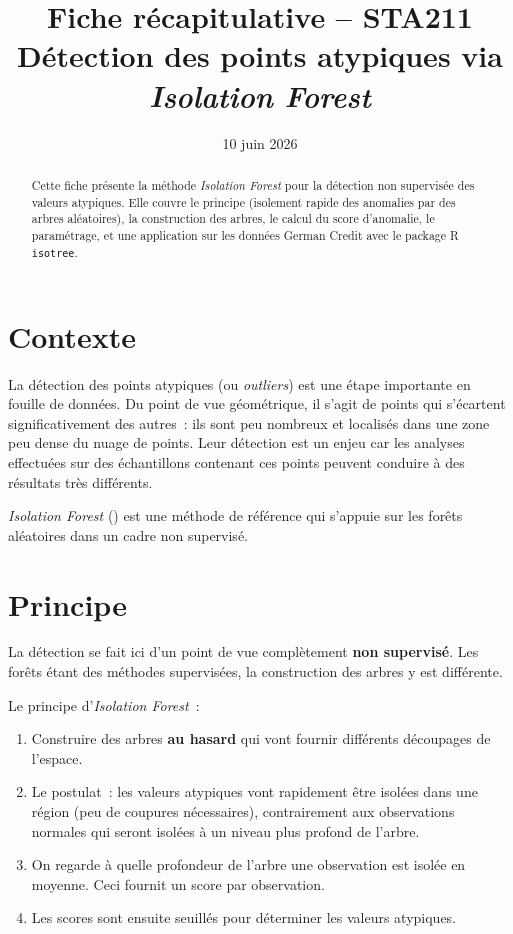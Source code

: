 \documentclass[a4paper,11pt]{article}
\title{\textbf{Fiche r\'ecapitulative -- STA211}\\[4pt]
\large D\'etection des points atypiques via \emph{Isolation Forest}}
\author{}
\date{10 juin 2026}
\theoremstyle{definition}
\theoremstyle{remark}
\begin{document}
\maketitle
\thispagestyle{empty}

\begin{abstract}
Cette fiche pr\'esente la m\'ethode \emph{Isolation Forest} pour la d\'etection
non supervis\'ee des valeurs atypiques. Elle couvre le principe (isolement
rapide des anomalies par des arbres al\'eatoires), la construction des arbres,
le calcul du score d'anomalie, le param\'etrage, et une application sur les
donn\'ees German Credit avec le package R \texttt{isotree}.
\end{abstract}

\vfill
\tableofcontents
\newpage

\section{Contexte}

La d\'etection des points atypiques (ou \emph{outliers}) est une \'etape
importante en fouille de donn\'ees. Du point de vue g\'eom\'etrique, il s'agit
de points qui s'\'ecartent significativement des autres~: ils sont peu nombreux
et localis\'es dans une zone peu dense du nuage de points. Leur d\'etection est
un enjeu car les analyses effectu\'ees sur des \'echantillons contenant ces
points peuvent conduire \`a des r\'esultats tr\`es diff\'erents.

\emph{Isolation Forest} (\cite{LiuTZ08}) est une m\'ethode de r\'ef\'erence
qui s'appuie sur les for\^ets al\'eatoires dans un cadre non supervis\'e.

\section{Principe}

La d\'etection se fait ici d'un point de vue compl\`etement
\textbf{non supervis\'e}. Les for\^ets \'etant des m\'ethodes supervis\'ees,
la construction des arbres y est diff\'erente.

Le principe d'\emph{Isolation Forest}~:
\begin{enumerate}
  \item Construire des arbres \textbf{au hasard} qui vont fournir
    diff\'erents d\'ecoupages de l'espace.
  \item Le postulat~: les valeurs atypiques vont rapidement \^etre isol\'ees
    dans une r\'egion (peu de coupures n\'ecessaires), contrairement aux
    observations normales qui seront isol\'ees \`a un niveau plus profond
    de l'arbre.
  \item On regarde \`a quelle profondeur de l'arbre une observation est
    isol\'ee en moyenne. Ceci fournit un score par observation.
  \item Les scores sont ensuite seuill\'es pour d\'eterminer les valeurs
    atypiques.
\end{enumerate}
\end{document}

